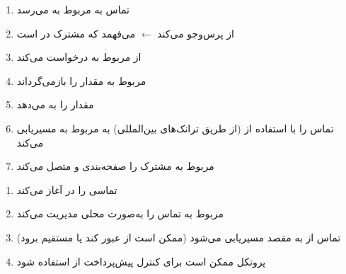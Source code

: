 



\begin{enumerate}
\def\labelenumi{\arabic{enumi}.}
\tightlist
\item
  تماس به  مربوط به  می‌رسد
\item
   از  پرس‌وجو می‌کند \ensuremath{\leftarrow} می‌فهمد که مشترک در  است
\item
   از  مربوط به  درخواست  می‌کند
\item
   مربوط به  مقدار  را بازمی‌گرداند
\item
   مقدار  را به  می‌دهد
\item
   تماس را با استفاده از  (از طریق ترانک‌های بین‌المللی) به  مربوط به  مسیریابی می‌کند
\item
   مربوط به  مشترک را صفحه‌بندی و متصل می‌کند
\end{enumerate}


\begin{enumerate}
\def\labelenumi{\arabic{enumi}.}
\tightlist
\item
   تماسی را در  آغاز می‌کند
\item
   مربوط به  تماس را به‌صورت محلی مدیریت می‌کند
\item
  تماس از  به مقصد مسیریابی می‌شود (ممکن است از  عبور کند یا مستقیم برود)
\item
  پروتکل  ممکن است برای کنترل پیش‌پرداخت از  استفاده شود
\end{enumerate}



\CNchained{}

